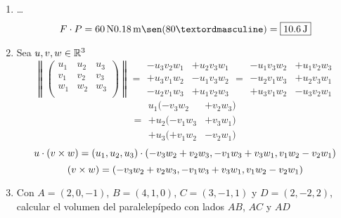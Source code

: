 \documentclass[../practica.root.tex]{subfiles}
\begin{document}
\begin{enumerate}
    \item \dots
          \[F \cdot P = \SI{60}{\newton}\SI{0,18}{\m}\sen(80º) = \boxed{\SI{10,6}{\joule}} \]

    \item Sea $u,v,w \in \mathbb{R}^3$
          \[
              \left\|
              \begin{pmatrix}
                  u_1 & u_2 & u_3 \\
                  v_1 & v_2 & v_3 \\
                  w_1 & w_2 & w_3 \\
              \end{pmatrix}
              \right\|
              =
              \begin{array}{rl}
                  -u_3 v_2 w_1  & + u_2 v_3 w_1 \\
                  + u_3 v_1 w_2 & - u_1 v_3 w_2 \\
                  - u_2 v_1 w_3 & + u_1 v_2 w_3
              \end{array}
              =
              \begin{array}{rl}
                  - u_1 v_3 w_2 & + u_1 v_2 w_3 \\
                  - u_2 v_1 w_3 & + u_2 v_3 w_1 \\
                  + u_3 v_1 w_2 & -u_3 v_2 w_1
              \end{array}
          \] \[
              =
              \begin{array}{rl}
                  u_1(- v_3 w_2   & + v_2 w_3) \\
                  + u_2(- v_1 w_3 & + v_3 w_1) \\
                  + u_3(+ v_1 w_2 & -v_2 w_1)
              \end{array}
          \] \[
              u \cdot (v \times w) = (u_1, u_2, u_3) \cdot (-v_3w_2+v_2w_3, -v_1w_3+v_3w_1, v_1w_2-v_2w_1)
          \] \[
              (v \times w) = (-v_3w_2+v_2w_3, -v_1w_3+v_3w_1, v_1w_2-v_2w_1)
          \]

    \item Con $A = (2, 0, -1)$, $B = (4, 1, 0)$, $C = (3, -1, 1)$ y $D = (2, -2, 2)$,
          calcular el volumen del paralelepípedo con lados $AB$, $AC$ y $AD$

\end{enumerate}
\end{document}
